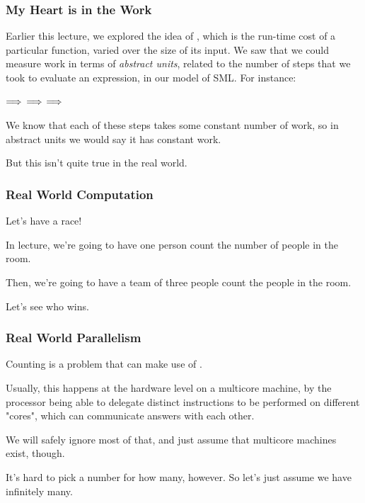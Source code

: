 \documentclass[aspectratio=169]{beamer}
\begin{document}

\begin{frame}[fragile]
  \frametitle{My Heart is in the Work}

  Earlier this lecture, we explored the idea of , which is the run-time cost of a particular function,
  varied over the size of its input. We saw that we could measure work in terms of \textit{abstract units}, related 
  to the number of steps that we took to evaluate an expression, in our model of SML. For instance:

   $\Longrightarrow$  $\Longrightarrow$  $\Longrightarrow$  

  We know that each of these steps takes some constant number of work, so in abstract units we would say it has constant work. 

  But this isn't quite true in the real world.
\end{frame}

\begin{frame}[fragile]
  \frametitle{Real World Computation}

  Let's have a race! 

  In lecture, we're going to have one person count the number of people in the room.

  Then, we're going to have a team of three people count the people in the room.

  Let's see who wins.
\end{frame}

\begin{frame}[fragile]
  \frametitle{Real World Parallelism}

  Counting is a problem that can make use of .


  Usually, this happens at the hardware level on a multicore machine, by the processor being
  able to delegate distinct instructions to be performed on different "cores", which can
  communicate answers with each other. 
  
  We will safely ignore most of that, and just assume that multicore machines exist, though.
  
  It's hard to pick a number for how many, however. So let's just assume we have infinitely many.
\end{frame}
\end{document}
